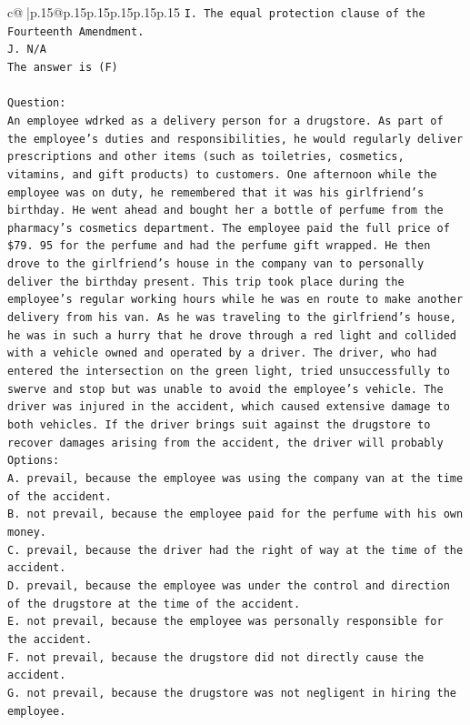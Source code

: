 \documentclass{article}
\begin{document}
{\begin{supertabular}{c@{$\;$}|p{.15\linewidth}@{}p{.15\linewidth}p{.15\linewidth}p{.15\linewidth}p{.15\linewidth}p{.15\linewidth}}
{{{\texttt{I. The equal protection clause of the Fourteenth Amendment.} \\
\texttt{J. N/A} \\
\texttt{The answer is (F)} \\
\\ 
\texttt{Question:} \\
\texttt{An employee wdrked as a delivery person for a drugstore. As part of the employee's duties and responsibilities, he would regularly deliver prescriptions and other items (such as toiletries, cosmetics, vitamins, and gift products) to customers. One afternoon while the employee was on duty, he remembered that it was his girlfriend's birthday. He went ahead and bought her a bottle of perfume from the pharmacy's cosmetics department. The employee paid the full price of \$79. 95 for the perfume and had the perfume gift wrapped. He then drove to the girlfriend's house in the company van to personally deliver the birthday present. This trip took place during the employee's regular working hours while he was en route to make another delivery from his van. As he was traveling to the girlfriend's house, he was in such a hurry that he drove through a red light and collided with a vehicle owned and operated by a driver. The driver, who had entered the intersection on the green light, tried unsuccessfully to swerve and stop but was unable to avoid the employee's vehicle. The driver was injured in the accident, which caused extensive damage to both vehicles. If the driver brings suit against the drugstore to recover damages arising from the accident, the driver will probably} \\
\texttt{Options:} \\
\texttt{A. prevail, because the employee was using the company van at the time of the accident.} \\
\texttt{B. not prevail, because the employee paid for the perfume with his own money.} \\
\texttt{C. prevail, because the driver had the right of way at the time of the accident.} \\
\texttt{D. prevail, because the employee was under the control and direction of the drugstore at the time of the accident.} \\
\texttt{E. not prevail, because the employee was personally responsible for the accident.} \\
\texttt{F. not prevail, because the drugstore did not directly cause the accident.} \\
\texttt{G. not prevail, because the drugstore was not negligent in hiring the employee.} \\
}}}
\end{supertabular}}
\end{document}
